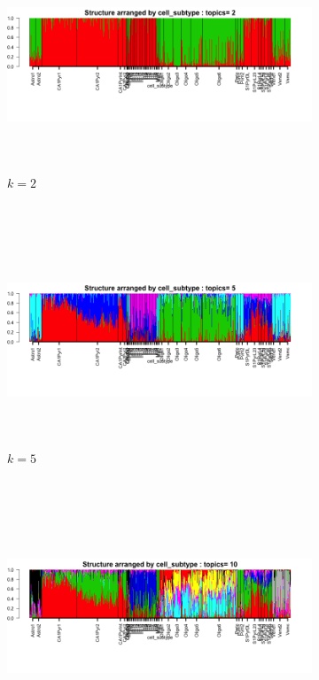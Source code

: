  \begin{figure}[ht]
    \raggedright
     \begin{subfigure}[t]{0.3\textwidth}
        \raggedleft
        \includegraphics[height=2.5in]{../plots/Zeisel/clus_2/struct_clus_2_cell_subtype.png}
        \raggedright 
        \vspace{-0.5in} \qquad  \qquad  \caption{$k=2$}
    \end{subfigure}    \\
    \begin{subfigure}[t]{0.5\textwidth}
        \raggedleft
        \includegraphics[height=2.5in]{../plots/Zeisel/clus_5/struct_clus_5_cell_subtype.png}
        \raggedright
        \vspace{-0.5in}  \qquad  \qquad \caption{$k=5$}
    \end{subfigure}    \\
    \begin{subfigure}[t]{0.5\textwidth}
        \raggedleft
        \includegraphics[height=2.5in]{../plots/Zeisel/clus_10/struct_clus_10_cell_subtype.png}

\end{subfigure}
\end{figure}
